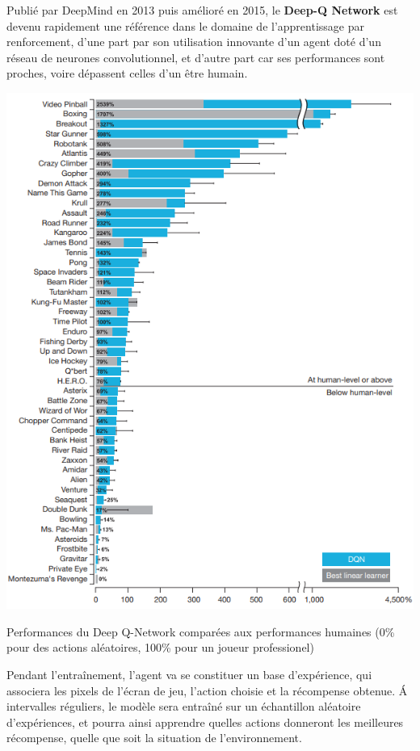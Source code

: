 \documentclass[a4paper,12pt]{article}
\begin{document}
Publié par DeepMind en 2013 puis amélioré en 2015, le \textbf{Deep-Q Network} \cite{deep_q_learning, mnih2015humanlevel} est devenu rapidement une référence dans le domaine de l'apprentissage par renforcement, d'une part par son utilisation innovante d'un agent doté d'un réseau de neurones convolutionnel, et d'autre part car ses performances sont proches, voire dépassent celles d'un être humain.\par
\medskip
\begin{center}
\includegraphics[width=1\textwidth]{E3_images/DQN.png}\par
{\small Performances du Deep Q-Network comparées aux performances humaines (0\% pour des actions aléatoires, 100\% pour un joueur professionel)\par}
\end{center}
\medskip
Pendant l'entraînement,  l'agent va se constituer un base d'expérience, qui associera les pixels de l'écran de jeu, l'action choisie et la récompense obtenue. \'A intervalles réguliers, le modèle sera entraîné sur un échantillon aléatoire d'expériences, et pourra ainsi apprendre quelles actions donneront les meilleures récompense, quelle que soit la situation de l'environnement.\par
\end{document}
